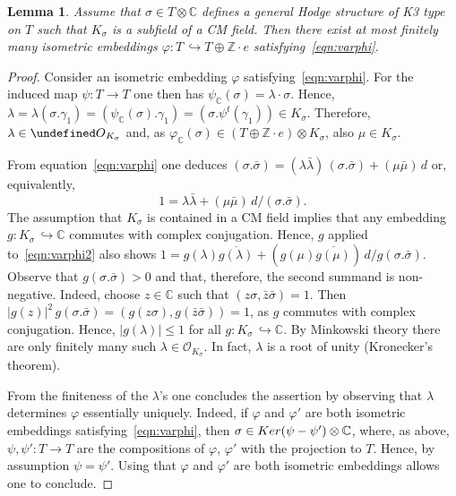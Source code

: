 \documentclass[11pt]{article}
\newtheorem{lemm}[theo]{Lemma}
\theoremstyle{definition}
\numberwithin{equation}{section}
\numberwithin{figure}{section}
\numberwithin{table}{section}
\let\cal\undefined
\newcommand{\cal}{\mathcal}
\newcommand{\ko}{{\cal O}}
\newcommand{\ZZ}{\mathbb{Z}}
\newcommand{\CC}{\mathbb{C}}
\begin{document}
\begin{lemm}\label{lem:CMlambda}
Assume that $\sigma\in T\otimes\CC$ defines a general Hodge structure of K3 type on $T$ such that $K_\sigma$ is a subfield of a CM field. Then there exist at most finitely many isometric embeddings $\varphi\colon T\,\hookrightarrow T\oplus\ZZ\cdot e$ satisfying~\eqref{eqn:varphi}.
\end{lemm}

\begin{proof}
Consider an isometric embedding $\varphi$ satisfying~\eqref{eqn:varphi}. For the induced map $\psi\colon T\to T$ one then has $\psi_\CC(\sigma)=\lambda\cdot \sigma$. Hence, $\lambda=\lambda(\sigma.\gamma_1)=(\psi_\CC(\sigma).\gamma_1)=(\sigma.\psi^t(\gamma_1))\in K_\sigma$. Therefore, $\lambda\in\ko_{K_\sigma}$ and, as $\varphi_\CC(\sigma)\in (T\oplus\ZZ\cdot e)\otimes K_\sigma$, also $\mu\in K_\sigma$.


From equation~\eqref{eqn:varphi} one deduces $(\sigma.\bar\sigma)=(\lambda\bar\lambda)\,(\sigma.\bar\sigma)+(\mu\bar\mu)\, d$ or, equivalently,
\begin{equation}\label{eqn:varphi2}
1=\lambda\bar\lambda+(\mu\bar\mu)\, d/(\sigma.\bar\sigma).
\end{equation}
The assumption that $K_\sigma$ is contained in a CM field implies that any embedding $g\colon K_\sigma\,\hookrightarrow \CC$ commutes with complex conjugation. Hence, $g$ applied to~\eqref{eqn:varphi2} also shows $1=g(\lambda)\overline{g(\lambda)}+(g(\mu)\overline{g(\mu)})\, d /g(\sigma.\bar\sigma)$. Observe that $g(\sigma.\bar\sigma)>0$ and that, therefore, the second summand is non-negative. Indeed, choose $z\in \CC$ such that $(z\sigma,\bar z\bar\sigma)=1$. Then $|g(z)|^2\,g(\sigma.\bar\sigma)=(g(z\sigma),g(\bar z\bar \sigma))=1$, as $g$ commutes with complex conjugation. Hence, $|g(\lambda)|\leq 1$ for all $g\colon K_\sigma\,\hookrightarrow\CC$. By Minkowski theory there are only finitely many such $\lambda\in{\mathcal O}_{K_\sigma}$. In fact, $\lambda$ is a root of unity (Kronecker's theorem).

From the finiteness of the $\lambda$'s one concludes the assertion by observing that $\lambda$ determines $\varphi$ essentially uniquely. Indeed, if $\varphi$ and $\varphi'$ are both isometric embeddings satisfying~\eqref{eqn:varphi}, then $\sigma\in{\rm Ker}(\psi-\psi')\otimes\CC$, where, as above, $\psi,\psi'\colon T\to T$ are the compositions of $\varphi$, $\varphi'$ with the projection to $T$. Hence, by assumption $\psi=\psi'$. Using that $\varphi$ and $\varphi'$ are both isometric embeddings allows one to conclude.
\end{proof}
\end{document}
